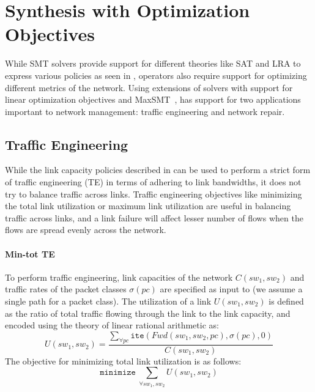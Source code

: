 \section{Synthesis with Optimization Objectives}
\label{sec:optimization}

While SMT solvers provide support for different theories like SAT and
LRA to express various policies as seen in , 
operators also require support for optimizing different metrics of the network. Using extensions of solvers with support
 for linear optimization objectives and MaxSMT~\cite{maxsmt}, 
 \name has support for two applications important to network
 management: 
 traffic engineering and network repair.

\subsection{Traffic Engineering}
While the link capacity policies described in  can
be used to perform a strict form of traffic engineering (TE) in terms of 
adhering to link bandwidths, it does not try to balance traffic across links.
Traffic engineering objectives like 
minimizing the total link utilization 
or maximum link utilization are useful in balancing  
traffic across links, and a link failure will affect lesser number of flows
when the flows are spread evenly across the network. 

\paragraph{Min-tot TE}
To perform traffic engineering, link capacities of the network $C(sw_1, sw_2)$ and traffic 
rates of the packet classes $\sigma(pc)$ are specified as input to \name (we assume a single
path for a packet class). The utilization 
of a link $U(sw_1, sw_2)$ is defined as the ratio of total traffic flowing through the link to the 
link capacity, and encoded using the theory of linear rational arithmetic as:
\begin{equation}
U(sw_1, sw_2) = \frac{\sum_{\forall pc} \texttt{ite}(Fwd(sw_1,sw_2, pc), \sigma(pc), 0)} {C(sw_1, sw_2)}
\end{equation}
The objective for minimizing total link utilization is as follows:
\begin{equation}
	\texttt{minimize}\ \sum_{\forall sw_1, sw_2} U(sw_1, sw_2)
\end{equation}
